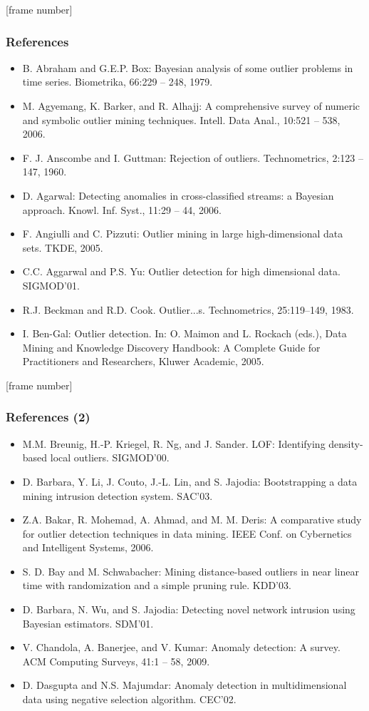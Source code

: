 \documentclass[aspectratio=169,t,xcolor=dvipsnames]{beamer}
\begin{document}
{
  [frame number]
  \begin{frame}
	\frametitle{References}
	\begin{itemize}
		\item B. Abraham and G.E.P. Box: Bayesian analysis of some outlier problems in time series. Biometrika, 66:229 -- 248, 1979.
		\item M. Agyemang, K. Barker, and R. Alhajj: A comprehensive survey of numeric and symbolic outlier mining techniques. Intell. Data Anal., 10:521 -- 538, 2006.
		\item F. J. Anscombe and I. Guttman: Rejection of outliers. Technometrics, 2:123 -- 147, 1960.
		\item D. Agarwal: Detecting anomalies in cross-classified streams: a Bayesian approach. Knowl. Inf. Syst., 11:29 -- 44, 2006.
		\item F. Angiulli and C. Pizzuti: Outlier mining in large high-dimensional data sets. TKDE, 2005.
		\item C.C. Aggarwal and P.S. Yu: Outlier detection for high dimensional data. SIGMOD'01.
		\item R.J. Beckman and R.D. Cook. Outlier...s. Technometrics, 25:119–149, 1983.
		\item I. Ben-Gal: Outlier detection. In: O. Maimon and L. Rockach (eds.), Data Mining and Knowledge Discovery Handbook: A Complete Guide for Practitioners and Researchers, Kluwer Academic, 2005.
	\end{itemize}
\end{frame}
}

{
  [frame number]
  \begin{frame}
  	\frametitle{References (2)}
  	\begin{itemize}
  		\item M.M. Breunig, H.-P. Kriegel, R. Ng, and J. Sander. LOF: Identifying density-based local outliers. SIGMOD'00.
  		\item D. Barbara, Y. Li, J. Couto, J.-L. Lin, and S. Jajodia: Bootstrapping a data mining intrusion detection system. SAC'03.
  		\item Z.A. Bakar, R. Mohemad, A. Ahmad, and M. M. Deris: A comparative study for outlier detection techniques in data mining. IEEE Conf. on Cybernetics and Intelligent Systems, 2006.
  		\item S. D. Bay and M. Schwabacher: Mining distance-based outliers in near linear time with randomization and a simple pruning rule. KDD'03.
  		\item D. Barbara, N. Wu, and S. Jajodia: Detecting novel network intrusion using Bayesian estimators. SDM'01.
  		\item V. Chandola, A. Banerjee, and V. Kumar: Anomaly detection: A survey. ACM Computing Surveys, 41:1 -- 58, 2009.
  		\item D. Dasgupta and N.S. Majumdar: Anomaly detection in multidimensional data using negative selection algorithm. CEC'02.
  	\end{itemize}
  \end{frame}
}
\end{document}
